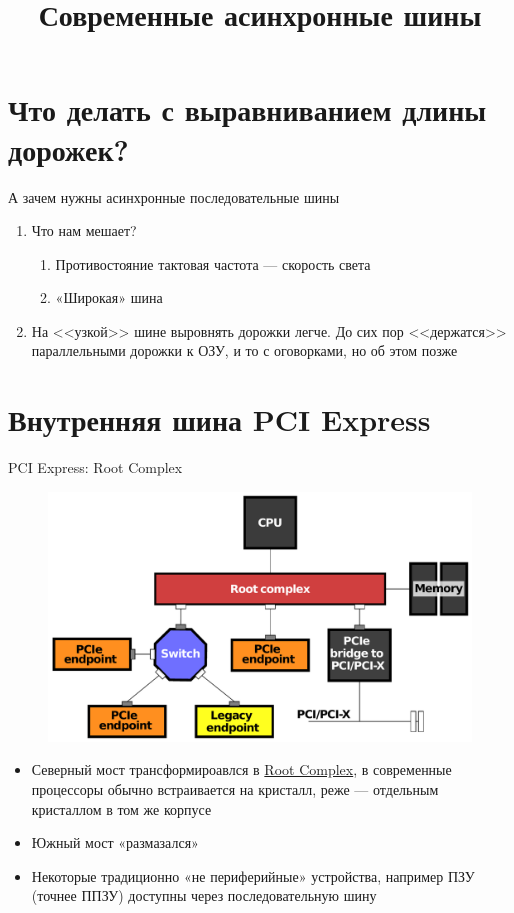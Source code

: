 \documentclass[xetex,aspectratio=43]{beamer}
\title[Современные асинхронные шины]{Современные асинхронные шины}
\begin{document}
\titleslide

\tocslide

\section{Что делать с выравниванием длины дорожек?}

\begin{frame}{А зачем нужны асинхронные последовательные шины}
    \begin{enumerate}
        \item Что нам мешает?
        \begin{enumerate}
            \item Противостояние тактовая частота --- скорость света
            \item «Широкая» шина
        \end{enumerate}
        \pause
        \item На <<узкой>> шине выровнять дорожки легче. До сих пор <<держатся>> параллельными дорожки к ОЗУ, и то с оговорками, но об этом позже
    \end{enumerate}
\end{frame}

\section{Внутренняя шина PCI Express}

\begin{frame}{PCI Express: Root Complex}
	\begin{figure}
        \includegraphics[height=0.5\textheight]{img/04.Example_PCI_Express_Topology.pdf}
    \end{figure}
    \begin{itemize}
        \item Северный мост трансформироавлся в \href{https://en.wikipedia.org/wiki/Root_complex}{Root Complex}, в современные процессоры обычно встраивается на кристалл, реже --- отдельным кристаллом в том же корпусе
        \item Южный мост «размазался»
        \item Некоторые традиционно «не периферийные» устройства, например ПЗУ (точнее ППЗУ) доступны через последовательную шину
    \end{itemize}
\end{frame}
\end{document}
